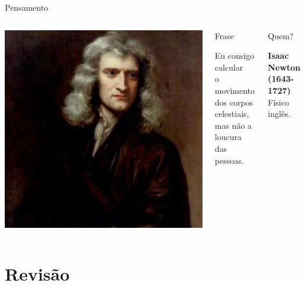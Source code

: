 \documentclass[xcolor=dvipsnames,table]{beamer}
\begin{document}
	\begin{frame}{Pensamento}
		\begin{columns}
		  		\begin{center}
		    		\includegraphics[height=.55\textheight]{images/newton}
		  		\end{center}
				\begin{block}{Frase}
					\begin{center}
						{\large Eu consigo calcular \\o movimento dos corpos celestiais, \\mas não a loucura das pessoas.}
					\end{center}
				\end{block}		  		
		  		\begin{block}{Quem?}
		  			\begin{center}
						{\bf Isaac Newton (1643-1727)} \\ Físico inglês.
					\end{center}
				\end{block}
		\end{columns}
	\end{frame}
	
	\section{Revisão}
	
\end{document}
